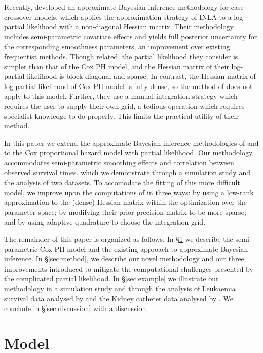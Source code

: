 \documentclass[ba]{imsart}
\begin{document}
Recently, \cite{casecross} developed an approximate Bayesian inference methodology for case-crossover models, which applies the approximation strategy of INLA to a log-partial likelihood with a non-diagonal Hessian matrix. Their methodology includes semi-parametric covariate effects and yields full posterior uncertainty for the corresponding smoothness parameters, an improvement over existing frequentist methods. Though related, the partial likelihood they consider is simpler than that of the Cox PH model, and the Hessian matrix of their log-partial likelihood is block-diagonal and sparse. In contrast, the Hessian matrix of log-partial likelihood of Cox PH model is fully dense, so the method of \cite{casecross} does not apply to this model. Further, they use a manual integration strategy which requires the user to supply their own grid, a tedious operation which requires specialist knowledge to do properly. This limits the practical utility of their method.

In this paper we extend the approximate Bayesian inference methodologies of \cite{casecross} and \cite{inlacoxph} to the Cox proportional hazard model with partial likelihood. Our methodology accommodates semi-parametric smoothing effects and correlation between observed survival times, which we demonstrate through a simulation study and the analysis of two datasets. To accomodate the fitting of this more difficult model, we improve upon the computations of \cite{casecross} in three ways: by using a low-rank approximation to the (dense) Hessian matrix within the optimization over the parameter space; by modifying their prior precision matrix to be more sparse; and by using adaptive quadrature to choose the integration grid.

The remainder of this paper is organized as follows. In \S\ref{sec:model} we describe the semi-parametric Cox PH model and the existing approach to approximate Bayesian inference. In \S\ref{sec:method}, we describe our novel methodology and our three improvements introduced to mitigate the computational challenges presented by the complicated partial likelihood. In \S\ref{sec:example} we illustrate our methodology in a simulation study and through the analysis of Leukaemia survival data analysed by \cite{inlacoxph} and the Kidney catheter data analysed by \cite{kidney}. We conclude in \S\ref{sec:discussion} with a discussion.

\section{Model}\label{sec:model}
\end{document}
